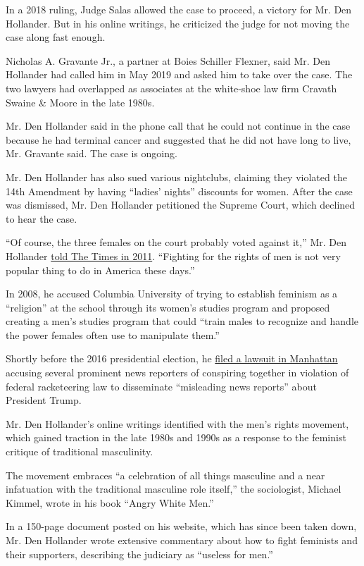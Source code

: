In a 2018 ruling, Judge Salas allowed the case to proceed, a victory for
Mr. Den Hollander. But in his online writings, he criticized the judge
for not moving the case along fast enough.

Nicholas A. Gravante Jr., a partner at Boies Schiller Flexner, said Mr.
Den Hollander had called him in May 2019 and asked him to take over the
case. The two lawyers had overlapped as associates at the white-shoe law
firm Cravath Swaine \& Moore in the late 1980s.

Mr. Den Hollander said in the phone call that he could not continue in
the case because he had terminal cancer and suggested that he did not
have long to live, Mr. Gravante said. The case is ongoing.

Mr. Den Hollander has also sued various nightclubs, claiming they
violated the 14th Amendment by having ``ladies' nights'' discounts for
women. After the case was dismissed, Mr. Den Hollander petitioned the
Supreme Court, which declined to hear the case.

``Of course, the three females on the court probably voted against it,''
Mr. Den Hollander
\href{https://cityroom.blogs.nytimes.com/2011/01/13/one-mans-odd-fight-against-ladies-nights/}{told
The Times in 2011}. ``Fighting for the rights of men is not very popular
thing to do in America these days.''

In 2008, he accused Columbia University of trying to establish feminism
as a ``religion'' at the school through its women's studies program and
proposed creating a men's studies program that could ``train males to
recognize and handle the power females often use to manipulate them.''

Shortly before the 2016 presidential election, he
\href{https://assets.documentcloud.org/documents/3034119/16cv6624-1-Complaint.pdf}{filed
a lawsuit in Manhattan} accusing several prominent news reporters of
conspiring together in violation of federal racketeering law to
disseminate ``misleading news reports'' about President Trump.

Mr. Den Hollander's online writings identified with the men's rights
movement, which gained traction in the late 1980s and 1990s as a
response to the feminist critique of traditional masculinity.

The movement embraces ``a celebration of all things masculine and a near
infatuation with the traditional masculine role itself,'' the
sociologist, Michael Kimmel, wrote in his book ``Angry White Men.''

In a 150-page document posted on his website, which has since been taken
down, Mr. Den Hollander wrote extensive commentary about how to fight
feminists and their supporters, describing the judiciary as ``useless
for men.''

